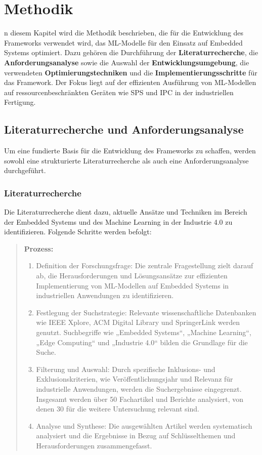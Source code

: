 \chapter{Methodik}
\label{chap:methodik}

n diesem Kapitel wird die Methodik beschrieben, die für die Entwicklung des Frameworks verwendet wird, das ML-Modelle für den Einsatz auf Embedded Systems optimiert. 
Dazu gehören die Durchführung der \textbf{Literaturrecherche}, die \textbf{Anforderungsanalyse} sowie die Auswahl der \textbf{Entwicklungsumgebung}, die verwendeten 
\textbf{Optimierungstechniken} und die \textbf{Implementierungsschritte} für das Framework. Der Fokus liegt auf der effizienten Ausführung von ML-Modellen auf 
ressourcenbeschränkten Geräten wie SPS und IPC in der industriellen Fertigung.

\section{Literaturrecherche und Anforderungsanalyse}

Um eine fundierte Basis für die Entwicklung des Frameworks zu schaffen, werden sowohl eine strukturierte Literaturrecherche als auch eine Anforderungsanalyse durchgeführt.
\subsection{Literaturrecherche}

Die Literaturrecherche dient dazu, aktuelle Ansätze und Techniken im Bereich der Embedded Systems und des Machine Learning in der Industrie 4.0 zu identifizieren. 
Folgende Schritte werden befolgt:
\begin{quote}
\textbf{Prozess:}
\begin{enumerate}
\item Definition der Forschungsfrage: Die zentrale Fragestellung zielt darauf ab, die Herausforderungen und Lösungsansätze zur effizienten Implementierung von ML-Modellen auf Embedded Systems in industriellen Anwendungen zu identifizieren.
\item Festlegung der Suchstrategie: Relevante wissenschaftliche Datenbanken wie IEEE Xplore, ACM Digital Library und SpringerLink werden genutzt. Suchbegriffe wie „Embedded Systems“, „Machine Learning“, „Edge Computing“ und „Industrie 4.0“ bilden die Grundlage für die Suche.
\item Filterung und Auswahl: Durch spezifische Inklusions- und Exklusionskriterien, wie Veröffentlichungsjahr und Relevanz für industrielle Anwendungen, werden die Suchergebnisse eingegrenzt. Insgesamt werden über 50 Fachartikel und Berichte analysiert, von denen 30 für die weitere Untersuchung relevant sind.
\item Analyse und Synthese: Die ausgewählten Artikel werden systematisch analysiert und die Ergebnisse in Bezug auf Schlüsselthemen und Herausforderungen zusammengefasst.
\end{enumerate}
\end{quote}

